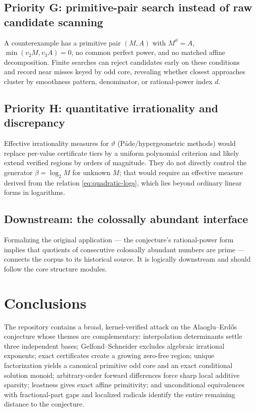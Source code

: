 \documentclass[11pt,oneside]{article}
\theoremstyle{definition}
\theoremstyle{remark}
\newcommand{\thetaq}{\vartheta}
\begin{document}
\subsection*{Priority G: primitive-pair search instead of raw candidate scanning}
A counterexample has a primitive pair $(M,A)$ with $M^{\thetaq}=A$,
$\min(v_2M,v_3A)=0$, no common perfect power, and no matched affine decomposition.  Finite
searches can reject candidates early on these conditions and record near misses keyed by
odd core, revealing whether closest approaches cluster by smoothness pattern, denominator,
or rational-power index $d$.

\subsection*{Priority H: quantitative irrationality and discrepancy}
Effective irrationality measures for $\thetaq$ (P\'ade/hypergeometric methods) would
replace per-value certificate tiers by a uniform polynomial criterion and likely extend
verified regions by orders of magnitude.  They do not directly control the generator
$\beta=\log_2M$ for unknown $M$; that would require an effective measure derived from the
relation \eqref{eq:quadratic-logs}, which lies beyond ordinary linear forms in logarithms.

\subsection*{Downstream: the colossally abundant interface}
Formalizing the original application --- the conjecture's rational-power form implies that
quotients of consecutive colossally abundant numbers are prime \cite{AE1944} --- connects
the corpus to its historical source.  It is logically downstream and should follow the core
structure modules.

\section{Conclusions}
\label{sec:conclusion}

The repository contains a broad, kernel-verified attack on the Alaoglu--Erd\H{o}s
conjecture whose themes are complementary: interpolation determinants settle three
independent bases; Gelfond--Schneider excludes algebraic irrational exponents; exact
certificates create a growing zero-free region; unique factorization yields a canonical
primitive odd core and an exact conditional solution monoid; arbitrary-order forward
differences force sharp local additive sparsity; leastness gives exact affine primitivity;
and unconditional equivalences with fractional-part gaps and localized radicals identify the
entire remaining distance to the conjecture.
\end{document}
